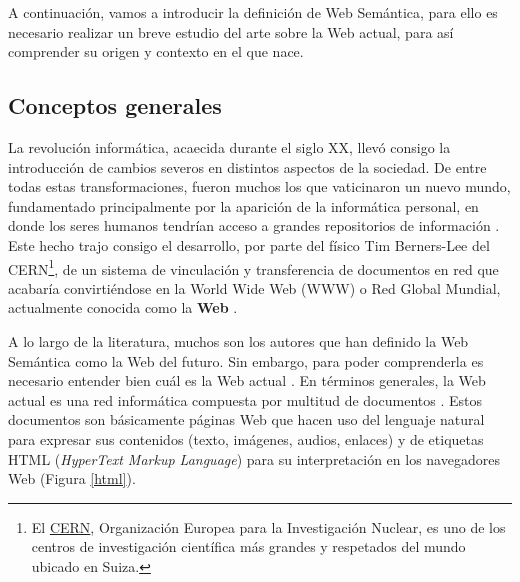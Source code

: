 A continuación, vamos a introducir la definición de Web Semántica, para ello es necesario realizar un breve estudio del arte sobre la Web actual, para así comprender su origen y contexto en el que nace.

\subsection{Conceptos generales}


La revolución informática, acaecida durante el siglo XX, llevó consigo la introducción de cambios severos en distintos aspectos de la sociedad. De entre todas estas transformaciones, fueron muchos los que vaticinaron un nuevo mundo, fundamentado principalmente por la aparición de la informática personal, en donde los seres humanos tendrían acceso a grandes repositorios de información \cite{semantica-web}. Este hecho trajo consigo el desarrollo, por parte del físico Tim Berners-Lee del CERN\footnote{El \href{https://home.cern}{CERN}, Organización Europea para la Investigación Nuclear, es uno de los centros de investigación científica más grandes y respetados del mundo ubicado en Suiza.}, de un sistema de vinculación y transferencia de documentos en red que acabaría convirtiéndose en la World Wide Web (WWW) o Red Global Mundial, actualmente conocida como la \textbf{Web} \cite{tesis}.

A lo largo de la literatura, muchos son los autores que han definido la Web Semántica como la Web del futuro. Sin embargo, para poder comprenderla es necesario entender bien cuál es la Web actual \cite{researchgate}. En términos generales, la Web actual es una red informática compuesta por multitud de documentos \cite{coursera}. Estos documentos son básicamente páginas Web que hacen uso del lenguaje natural para expresar sus contenidos (texto, imágenes, audios, enlaces) y de etiquetas HTML (\textit{HyperText Markup Language}) para su interpretación en los navegadores Web (Figura \ref{html}). 

